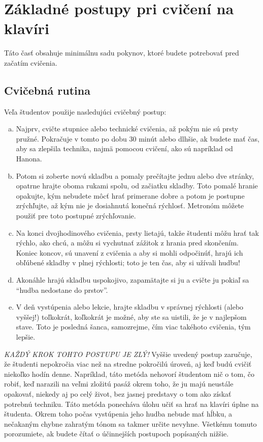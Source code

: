 \section{Základné postupy pri cvičení na klavíri}
Táto časť obsahuje minimálnu sadu pokynov, ktoré budete potrebovať pred začatím cvičenia. 

\subsection{Cvičebná rutina}
Veľa študentov použije nasledujúci cvičebný postup:
\begin{enumerate}[(a)]
\item Najprv, cvičte stupnice alebo technické cvičenia, až pokým nie sú prsty pružné. Pokračuje v tomto po dobu 30 minút alebo dlhšie, ak budete mať čas, aby sa zlepšila technika, najmä pomocou cvičení, ako sú napríklad od Hanona.
\item Potom si zoberte novú skladbu a pomaly prečítajte jednu alebo dve stránky, opatrne hrajte oboma rukami spolu, od začiatku skladby. Toto pomalé hranie opakujte, kým nebudete môcť hrať primerane dobre a potom je postupne zrýchľujte, až kým nie je dosiahnutá konečná rýchlosť. Metronóm môžete použiť pre toto postupné zrýchľovanie.
\item Na konci dvojhodinového cvičenia, prsty lietajú, takže študenti môžu hrať tak rýchlo, ako chcú, a môžu si vychutnať zážitok z hrania pred skončením. Koniec koncov, sú unavení z cvičenia a aby si mohli odpočinúť, hrajú ich obľúbené skladby v plnej rýchlosti; toto je ten čas, aby si užívali hudbu!
\item Akonáhle hrajú skladbu uspokojivo, zapamätajte si ju a cvičte ju pokiaľ sa “hudba nedostane do prstov”.
\item V deň vystúpenia alebo lekcie, hrajte skladbu v správnej rýchlosti (alebo vyššej!) toľkokrát, koľkokrát je možné, aby ste sa uistili, že je v najlepšom stave. Toto je posledná šanca, samozrejme, čím viac takéhoto cvičenia, tým lepšie.
\end{enumerate}
\emph{KAŽDÝ KROK TOHTO POSTUPU JE ZLÝ!} Vyššie uvedený postup zaručuje, že študenti nepokročia viac než na stredne pokročilú úroveň, aj keď budú cvičiť niekoľko hodín denne. Napríklad, táto metóda nehovorí študentom nič o tom, čo robiť, keď narazili na veľmi zložitú pasáž okrem toho, že ju majú neustále opakovať, niekedy aj po celý život, bez jasnej predstavy o tom ako získať potrebnú techniku. Táto metóda ponecháva úlohu učiť sa hrať na klavíri úplne na študenta. Okrem toho počas vystúpenia jeho hudba nebude mať hĺbku, a nečakaným chybne zahratým tónom sa takmer určite nevyhne. Všetkému tomuto porozumiete, ak budete čítať o účinnejších postupoch popísaných nižšie.

